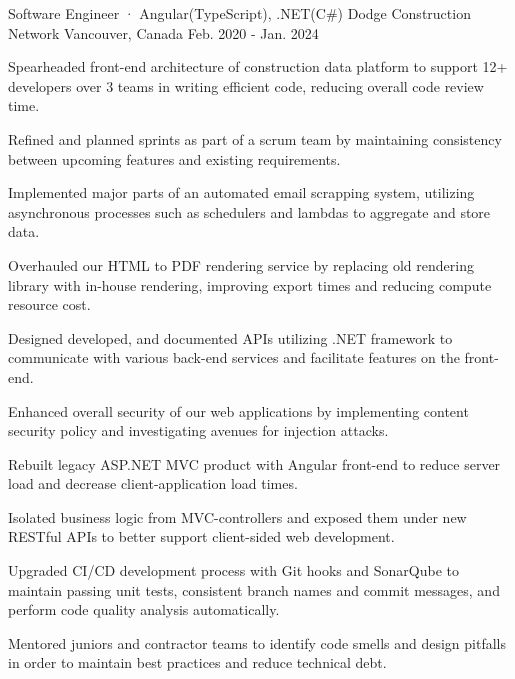 

\begin{cventries}

\cventry
  {Software Engineer · Angular(TypeScript), .NET(C\#)} %
  {Dodge Construction Network} %
  {Vancouver, Canada} %
  {Feb. 2020 - Jan. 2024} %
  {
    \begin{cvitems} %
      \item {Spearheaded front-end architecture of construction data platform to support 12+ developers over 3 teams in writing efficient code, reducing overall code review time.}
      \item {Refined and planned sprints as part of a scrum team by maintaining consistency between upcoming features and existing requirements.}
      \item {Implemented major parts of an automated email scrapping system, utilizing asynchronous processes such as schedulers and lambdas to aggregate and store data.}
      \item {Overhauled our HTML to PDF rendering service by replacing old rendering library with in-house rendering, improving export times and reducing compute resource cost.}
      \item {Designed developed, and documented APIs utilizing .NET framework to communicate with various back-end services and facilitate features on the front-end.}
      \item {Enhanced overall security of our web applications by implementing content security policy and investigating avenues for injection attacks.}
      \item {Rebuilt legacy ASP.NET MVC product with Angular front-end to reduce server load and decrease client-application load times.}
      \item {Isolated business logic from MVC-controllers and exposed them under new RESTful APIs to better support client-sided web development.}
      \item {Upgraded CI/CD development process with Git hooks and SonarQube to maintain passing unit tests, consistent branch names and commit messages, and perform code quality analysis automatically.}
      \item {Mentored juniors and contractor teams to identify code smells and design pitfalls in order to maintain best practices and reduce technical debt.}
    \end{cvitems}
  }


\end{cventries}

